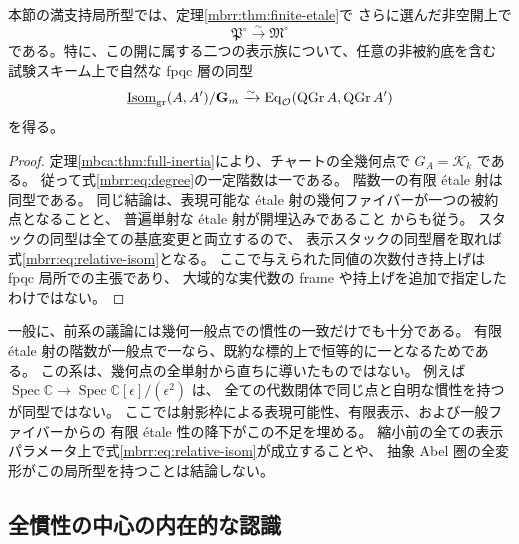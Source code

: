 \begin{corollary}[満支持一般開の全相対認識]
\label{mbrr:cor:stack-isomorphism}
本節の満支持局所型では、定理\ref{mbrr:thm:finite-etale}で
さらに選んだ非空開上で
\begin{equation}\label{mbrr:eq:stack-isomorphism}
 \mathfrak P^\circ\xrightarrow{\sim}\mathfrak M^\circ
\end{equation}
である。特に、この開に属する二つの表示族について、任意の非被約底を含む
試験スキーム上で自然な fpqc 層の同型
\begin{equation}\label{mbrr:eq:relative-isom}
 \underline{\operatorname{Isom}}_{\rm gr}(A,A')/\mathbf G_m
 \xrightarrow{\sim}
 \operatorname{Eq}_{\mathcal O}(\operatorname{QGr} A,\operatorname{QGr} A')
\end{equation}
を得る。
\end{corollary}
\begin{proof}
定理\ref{mbca:thm:full-inertia}により、チャートの全幾何点で
$G_A=\mathcal K_k$ である。
従って式\eqref{mbrr:eq:degree}の一定階数は一である。
階数一の有限 \'etale 射は同型である。
同じ結論は、表現可能な \'etale 射の幾何ファイバーが一つの被約点となることと、
普遍単射な \'etale 射が開埋込みであること
\cite[Tags~05W5, 0DUD]{MBGStacks}からも従う。
スタックの同型は全ての基底変更と両立するので、
表示スタックの同型層を取れば式\eqref{mbrr:eq:relative-isom}となる。
ここで与えられた同値の次数付き持上げは fpqc 局所での主張であり、
大域的な実代数の frame や持上げを追加で指定したわけではない。
\end{proof}

\begin{remark}[必要な相対議論]
一般に、前系の議論には幾何一般点での慣性の一致だけでも十分である。
有限 \'etale 射の階数が一般点で一なら、既約な標的上で恒等的に一となるためである。
この系は、幾何点の全単射から直ちに導いたものではない。
例えば $\operatorname{Spec}\mathbb C\to
\operatorname{Spec}\mathbb C[\epsilon]/(\epsilon^2)$ は、
全ての代数閉体で同じ点と自明な慣性を持つが同型ではない。
ここでは射影枠による表現可能性、有限表示、および一般ファイバーからの
有限 \'etale 性の降下がこの不足を埋める。
縮小前の全ての表示パラメータ上で式\eqref{mbrr:eq:relative-isom}が成立することや、
抽象 Abel 圏の全変形がこの局所型を持つことは結論しない。
\end{remark}

\subsection{全慣性の中心の内在的な認識}


